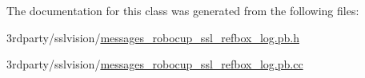 The documentation for this class was generated from the following files\-:\begin{DoxyCompactItemize}
\item 
3rdparty/sslvision/\hyperlink{messages__robocup__ssl__refbox__log_8pb_8h}{messages\-\_\-robocup\-\_\-ssl\-\_\-refbox\-\_\-log.\-pb.\-h}\item 
3rdparty/sslvision/\hyperlink{messages__robocup__ssl__refbox__log_8pb_8cc}{messages\-\_\-robocup\-\_\-ssl\-\_\-refbox\-\_\-log.\-pb.\-cc}\end{DoxyCompactItemize}
